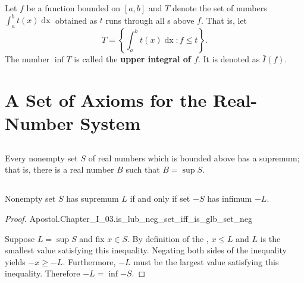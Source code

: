 \documentclass{report}
\begin{document}
\begin{definition}


\end{definition}

\section{}%
\label{ref:upper-integral}

Let $f$ be a function bounded on $[a, b]$ and $T$ denote the set of numbers
  $\int_a^b t(x) \mathop{dx}$ obtained as $t$ runs through all
  s above $f$.
That is, let $$T = \left\{ \int_a^b t(x) \mathop{dx} : f \leq t \right\}.$$
The number $\inf{T}$ is called the \textbf{upper integral of $f$}.
It is denoted as $\bar{I}(f)$.

\endgroup

\chapter{A Set of Axioms for the Real-Number System}%
\label{chap:set-axioms-real-number-system}

\section{}%
\label{sec:completeness-axiom}

Every nonempty set $S$ of real numbers which is bounded above has a supremum;
  that is, there is a real number $B$ such that $B = \sup{S}$.

\begin{axiom}


\end{axiom}

\section{}%
\label{sec:lemma-1}

\begin{lemma}[1]

  Nonempty set $S$ has supremum $L$ if and only if set $-S$ has infimum $-L$.

\end{lemma}

\begin{proof}

    {Apostol.Chapter\_I\_03.is\_lub\_neg\_set\_iff\_is\_glb\_set\_neg}

  Suppose $L = \sup{S}$ and fix $x \in S$.
  By definition of the , $x \leq L$ and $L$ is the
    smallest value satisfying this inequality.
  Negating both sides of the inequality yields $-x \geq -L$.
  Furthermore, $-L$ must be the largest value satisfying this inequality.
  Therefore $-L = \inf{-S}$.

\end{proof}
\end{document}
